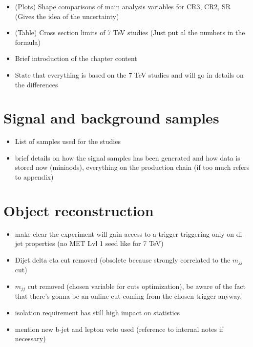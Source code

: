 
\begin{itemize}
	\item (Plots) Shape comparisons of main analysis variables for CR3, CR2, SR (Gives the idea of the uncertainty)
	\item (Table) Cross section limits of 7 TeV studies (Just put al the numbers in the formula)
\end{itemize}

\begin{itemize}
	\item Brief introduction of the chapter content
	\item State that everything is based on the 7 TeV studies and will go in details on the differences
\end{itemize}



\section{Signal and background samples}
\label{sec::samples_13tev}
\begin{itemize}
	\item List of samples used for the studies
	\item brief details on how the signal samples has been generated and how data is stored now (miniaods), everything on the production chain (if too much refers to appendix)
\end{itemize}



\section{Object reconstruction}
\begin{itemize}
	\item make clear the experiment will gain access to a trigger triggering only on di-jet properties (no MET Lvl 1 seed like for 7 TeV)
	\item Dijet delta eta cut removed (obsolete because strongly correlated to the $m_{jj}$ cut) 
	\item $m_{jj}$ cut removed (chosen variable for cuts optimization), be aware of the fact that there's gonna be an online cut coming from the chosen trigger anyway.
	\item \hadtau isolation requirement has still high impact on statistics
	\item mention new b-jet and lepton veto used (reference to internal notes if necessary)
\end{itemize}

